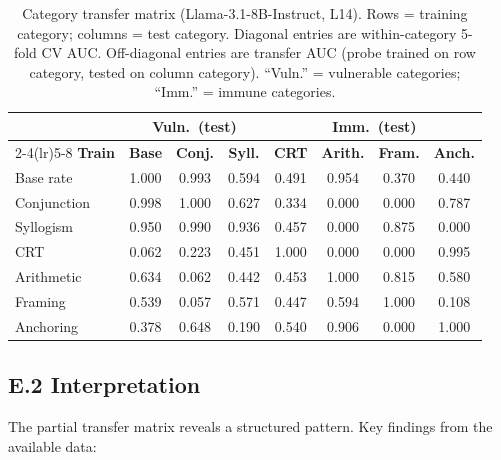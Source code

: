 \documentclass[accepted]{article}
\begin{document}
\begin{table}[ht]
\centering
\caption{Category transfer matrix (Llama-3.1-8B-Instruct, L14).
  Rows = training category; columns = test category.  Diagonal
  entries are within-category 5-fold CV AUC.  Off-diagonal entries
  are transfer AUC (probe trained on row category, tested on column
  category).  ``Vuln.'' = vulnerable categories; ``Imm.'' = immune
  categories.}
\label{tab:transfer_matrix}
\vspace{4pt}
\small
\begin{tabular}{lccc|cccc}
\toprule
& \multicolumn{3}{c}{\textbf{Vuln.\ (test)}} & \multicolumn{4}{c}{\textbf{Imm.\ (test)}} \\
\cmidrule(lr){2-4}\cmidrule(lr){5-8}
\textbf{Train} & \textbf{Base} & \textbf{Conj.} & \textbf{Syll.} & \textbf{CRT} & \textbf{Arith.} & \textbf{Fram.} & \textbf{Anch.} \\
\midrule
Base rate    & 1.000 & 0.993 & 0.594 & 0.491 & 0.954 & 0.370 & 0.440 \\
Conjunction  & 0.998 & 1.000 & 0.627 & 0.334 & 0.000 & 0.000 & 0.787 \\
Syllogism    & 0.950 & 0.990 & 0.936 & 0.457 & 0.000 & 0.875 & 0.000 \\
\midrule
CRT          & 0.062 & 0.223 & 0.451 & 1.000 & 0.000 & 0.000 & 0.995 \\
Arithmetic   & 0.634 & 0.062 & 0.442 & 0.453 & 1.000 & 0.815 & 0.580 \\
Framing      & 0.539 & 0.057 & 0.571 & 0.447 & 0.594 & 1.000 & 0.108 \\
Anchoring    & 0.378 & 0.648 & 0.190 & 0.540 & 0.906 & 0.000 & 1.000 \\
\bottomrule
\end{tabular}
\end{table}

\subsection*{E.2 Interpretation}

The partial transfer matrix reveals a structured pattern.  Key
findings from the available data:
\end{document}
